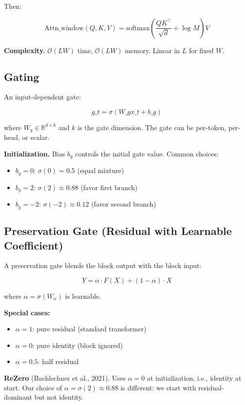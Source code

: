 Then:

\[
\text{Attn}\_\text{window}(Q, K, V) = \text{softmax}\!\left(\frac{QK^\top}{\sqrt{d}} + \log M\right)V
\tag{3.3}
\]

\textbf{Complexity.} $\mathcal{O}(L W)$ time, $\mathcal{O}(L W)$ memory. Linear 
in $L$ for fixed $W$.

\subsection{Gating}

An input-dependent gate:

\[
g\_t = \sigma(W\_g x\_t + b\_g)
\tag{3.4}
\]

where $W_g \in \mathbb{R}^{d \times k}$ and $k$ is the gate dimension. 
The gate can be per-token, per-head, or scalar.

\textbf{Initialization.} Bias $b_g$ controls the initial gate value. Common choices:
\begin{itemize}
\item $b_g = 0$: $\sigma(0) = 0.5$ (equal mixture)
\item $b_g = 2$: $\sigma(2) \approx 0.88$ (favor first branch)
\item $b_g = -2$: $\sigma(-2) \approx 0.12$ (favor second branch)

\end{itemize}
\subsection{Preservation Gate (Residual with Learnable Coefficient)}

A preservation gate blends the block output with the block input:

\[
Y = \alpha \cdot F(X) + (1 - \alpha) \cdot X
\tag{3.5}
\]

where $\alpha = \sigma(W_\alpha)$ is learnable.

\textbf{Special cases:}
\begin{itemize}
\item $\alpha = 1$: pure residual (standard transformer)
\item $\alpha = 0$: pure identity (block ignored)
\item $\alpha = 0.5$: half residual

\end{itemize}
\textbf{ReZero} (Bachlechner et al., 2021). Uses $\alpha = 0$ at initialization, 
i.e., identity at start. Our choice of $\alpha = \sigma(2) \approx 0.88$ is 
different: we start with residual-dominant but not identity.

